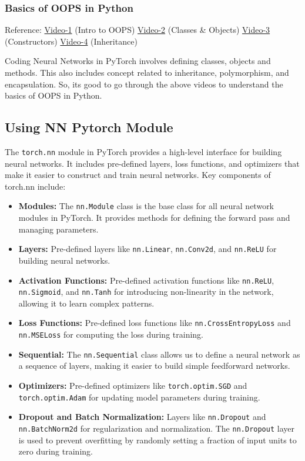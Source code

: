 \documentclass[12pt, a4paper]{article}
\begin{document}
\subsubsection{Basics of OOPS in Python}

Reference: \href{https://www.youtube.com/watch?v=HQnoYzxOHMw}{Video-1} (Intro to OOPS) \href{https://youtu.be/a7baAGCBA9U?si=dic4GqzG0pJtPffX}{Video-2} (Classes \& Objects) \href{https://youtu.be/12HRkYld22c?si=2YsB6D_8Efi1Otr0}{Video-3} (Constructors) \href{https://youtu.be/6soT3DMBJGQ?si=9a_6DyX1GmZFHFg9}{Video-4} (Inheritance) 

\vspace{0.5em}

Coding Neural Networks in PyTorch involves defining classes, objects and methods. This also includes concept related to inheritance, polymorphism, and encapsulation. So, its good to go through the above videos to understand the basics of OOPS in Python.

\subsection{Using NN Pytorch Module}
The \texttt{torch.nn} module in PyTorch provides a high-level interface for building neural networks. It includes pre-defined layers, loss functions, and optimizers that make it easier to construct and train neural networks.
Key components of torch.nn include:
\begin{itemize}[nosep]
    \item \textbf{Modules:} The \texttt{nn.Module} class is the base class for all neural network modules in PyTorch. It provides methods for defining the forward pass and managing parameters.
    \item \textbf{Layers:} Pre-defined layers like \texttt{nn.Linear}, \texttt{nn.Conv2d}, and \texttt{nn.ReLU} for building neural networks.
    \item \textbf{Activation Functions:} Pre-defined activation functions like \texttt{nn.ReLU}, \texttt{nn.Sigmoid}, and \texttt{nn.Tanh} for introducing non-linearity in the network, allowing it to learn complex patterns.
    \item \textbf{Loss Functions:} Pre-defined loss functions like \texttt{nn.CrossEntropyLoss} and \texttt{nn.MSELoss} for computing the loss during training.
    \item \textbf{Sequential:} The \texttt{nn.Sequential} class allows us to define a neural network as a sequence of layers, making it easier to build simple feedforward networks.
    \item \textbf{Optimizers:} Pre-defined optimizers like \texttt{torch.optim.SGD} and \texttt{torch.optim.Adam} for updating model parameters during training.
    \item \textbf{Dropout and Batch Normalization:} Layers like \texttt{nn.Dropout} and \texttt{nn.BatchNorm2d} for regularization and normalization. The \texttt{nn.Dropout} layer is used to prevent overfitting by randomly setting a fraction of input units to zero during training.
\end{itemize}
\end{document}
